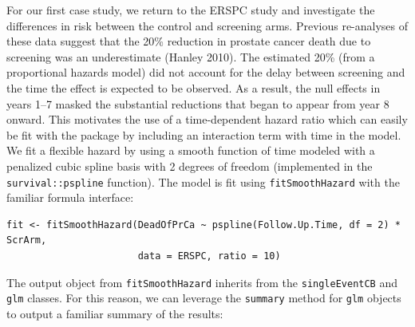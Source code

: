 For our first case study, we return to the ERSPC study and investigate the
differences in risk between the control and screening arms. Previous re-analyses
of these data suggest that the 20\% reduction in prostate cancer death due to
screening was an underestimate (Hanley 2010).
The estimated 20\% (from a proportional hazards model) did not account for
the delay between screening and the time the effect is expected to be observed.
As a result, the null effects in years 1--7 masked the substantial reductions
that began to appear from year 8 onward. This motivates the use of a
time-dependent hazard ratio which can easily be fit with the 
package by including an interaction term with time in the model. We fit a
flexible hazard by using a smooth function of time modeled with a penalized
cubic spline basis with 2 degrees of freedom (implemented in the
\texttt{survival::pspline} function). The model is fit using \texttt{fitSmoothHazard}
with the familiar formula interface:

\begin{verbatim}
fit <- fitSmoothHazard(DeadOfPrCa ~ pspline(Follow.Up.Time, df = 2) * ScrArm, 
                       data = ERSPC, ratio = 10)
\end{verbatim}

The output object from \texttt{fitSmoothHazard} inherits from the \texttt{singleEventCB}
and \texttt{glm} classes. For this reason, we can leverage the \texttt{summary}
method for \texttt{glm} objects to output a familiar summary of the results:

